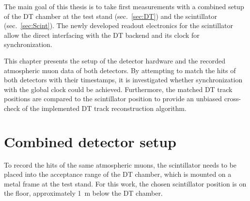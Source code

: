 \label{sec:Combined}
The main goal of this thesis is to take first measurements with a combined setup of the \ac{DT} chamber at the test stand (sec.\ \ref{sec:DT}) and the scintillator (sec.\ \ref{sec:Scint}). The newly developed readout electronics for the scintillator allow the direct interfacing with the \ac{DT} backend and its clock for synchronization.
\par This chapter presents the setup of the detector hardware and the recorded atmospheric muon data of both detectors. By attempting to match the hits of both detectors with their timestamps, it is investigated whether synchronization with the global clock could be achieved. Furthermore, the matched \ac{DT} track positions are compared to the scintillator position to provide an unbiased cross-check of the implemented \ac{DT} track reconstruction algorithm.

\FloatBarrier
\section{Combined detector setup}
\label{sec:Combined-Setup}
To record the hits of the same atmospheric muons, the scintillator needs to be placed into the acceptance range of the \ac{DT} chamber, which is mounted on a metal frame at the test stand. For this work, the chosen scintillator position is on the floor, approximately \SI{1}{\meter} below the \ac{DT} chamber.

